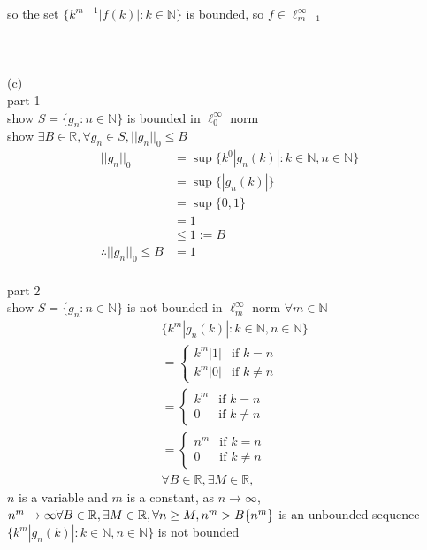 \documentclass[12pt, border = 4pt, multi]{article} %
\begin{document}
so the set $\{k ^ {m - 1}|f(k)|: k \in \mathbb{N}\}$ is bounded, so $f \in \ell_{m - 1} ^ {\infty}$\\
\\
\\
\\
(c)\\
part 1\\
show $S =  \{g_n: n \in \mathbb{N}\}$ is bounded in $\ell_0 ^ {\infty}$ norm\\
show $\exists B \in \mathbb{R}, \forall g_n \in S, ||g_n||_0 \leq B$
\begin{align*}
||g_n||_0 &= \sup\{k ^ 0 |g_n(k)|: k \in \mathbb{N}, n \in \mathbb{N}\}\\
&= \sup\{|g_n(k)|\}\\
&= \sup\{0, 1\}\\
&= 1\\
&\leq 1 := B\\
\therefore ||g_n||_0 \leq B &= 1
\end{align*}
\\
part 2\\
show $S =  \{g_n: n \in \mathbb{N}\}$ is not bounded in $\ell_m ^ {\infty}$ norm $\forall m \in \mathbb{N}$
\begin{align*}
&\{k ^ m |g_n(k)|: k \in \mathbb{N}, n \in \mathbb{N}\}\\
&= \begin{cases}
k ^ m|1| & \text{if } k = n\\
k ^ m|0| & \text{if } k \not= n
\end{cases}\\
&= \begin{cases}
k ^ m & \text{if } k = n\\
0 & \text{if } k \not= n
\end{cases}\\
&= \begin{cases}
n ^ m & \text{if } k = n\\
0 & \text{if } k \not= n
\end{cases}\\
&\forall B \in \mathbb{R}, \exists M \in \mathbb{R}, 
\end{align*}
$n$ is a variable and $m$ is a constant, as $n \rightarrow \infty$, $n ^ m \rightarrow \infty\\
\forall B \in \mathbb{R}, \exists M \in \mathbb{R}, \forall n \geq M, n ^ m > B\\
\{n ^ m\}$ is an unbounded sequence\\
$\{k ^ m |g_n(k)|: k \in \mathbb{N}, n \in \mathbb{N}\}$ is not bounded\\
\end{document}
